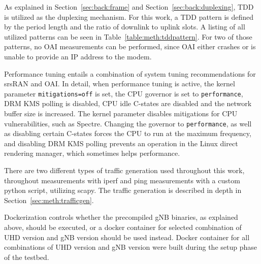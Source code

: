 As explained in Section~\ref{sec:back:frame} and Section~\ref{sec:back:duplexing}, \gls{TDD} is utilized as the duplexing mechanism.
For this work, a \gls{TDD} pattern is defined by the period length and the ratio of downlink to uplink slots.
A listing of all utilized patterns can be seen in Table~\ref{table:meth:tddpattern}.
For two of those patterns, no \gls{OAI} measurements can be performed, since \gls{OAI} either crashes or is
unable to provide an IP address to the modem.

Performance tuning entails a combination of system tuning recommendations for srsRAN and \gls{OAI}.
In detail, when performance tuning is active, the kernel parameter \texttt{mitigations=off} is set,
the CPU governor is set to \texttt{performance}, DRM KMS polling is disabled, CPU idle C-states are disabled and
the network buffer size is increased.
The kernel parameter disables mitigations for CPU vulnerabilities, such as Spectre.
Changing the governor to \texttt{performance}, as well as disabling certain C-states forces the CPU to run at the maximum frequency,
and disabling DRM KMS polling prevents an operation in the Linux direct rendering manager, which sometimes helps performance.

There are two different types of traffic generation used throughout this work, throughout measurements with iperf and
ping measurements with a custom python script, utilizing scapy.
The traffic generation is described in depth in Section~\ref{sec:meth:trafficgen}.

Dockerization controls whether the precompiled \gls{gNB} binaries, as explained above, should be executed, or
a docker container for selected combination of \gls{UHD} version and \gls{gNB} version should be used instead.
Docker container for all combinations of \gls{UHD} version and \gls{gNB} version were built during the setup
phase of the testbed.



